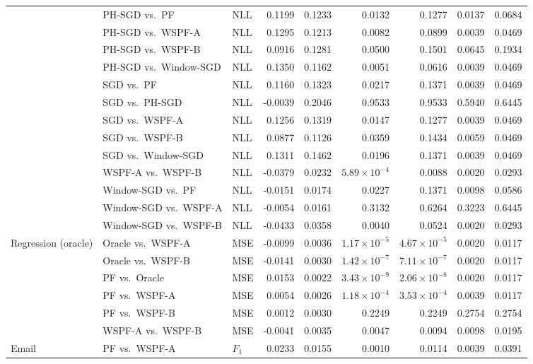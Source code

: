 {\begin{longtable}{@{}lllrrrrrr@{}}
 & PH-SGD vs.\ PF & NLL & 0.1199 & 0.1233 & 0.0132 & 0.1277 & 0.0137 & 0.0684 \\
 & PH-SGD vs.\ WSPF-A & NLL & 0.1295 & 0.1213 & 0.0082 & 0.0899 & 0.0039 & 0.0469 \\
 & PH-SGD vs.\ WSPF-B & NLL & 0.0916 & 0.1281 & 0.0500 & 0.1501 & 0.0645 & 0.1934 \\
 & PH-SGD vs.\ Window-SGD & NLL & 0.1350 & 0.1162 & 0.0051 & 0.0616 & 0.0039 & 0.0469 \\
 & SGD vs.\ PF & NLL & 0.1160 & 0.1323 & 0.0217 & 0.1371 & 0.0039 & 0.0469 \\
 & SGD vs.\ PH-SGD & NLL & -0.0039 & 0.2046 & 0.9533 & 0.9533 & 0.5940 & 0.6445 \\
 & SGD vs.\ WSPF-A & NLL & 0.1256 & 0.1319 & 0.0147 & 0.1277 & 0.0039 & 0.0469 \\
 & SGD vs.\ WSPF-B & NLL & 0.0877 & 0.1126 & 0.0359 & 0.1434 & 0.0059 & 0.0469 \\
 & SGD vs.\ Window-SGD & NLL & 0.1311 & 0.1462 & 0.0196 & 0.1371 & 0.0039 & 0.0469 \\
 & WSPF-A vs.\ WSPF-B & NLL & -0.0379 & 0.0232 & $5.89\times 10^{-4}$ & 0.0088 & 0.0020 & 0.0293 \\
 & Window-SGD vs.\ PF & NLL & -0.0151 & 0.0174 & 0.0227 & 0.1371 & 0.0098 & 0.0586 \\
 & Window-SGD vs.\ WSPF-A & NLL & -0.0054 & 0.0161 & 0.3132 & 0.6264 & 0.3223 & 0.6445 \\
 & Window-SGD vs.\ WSPF-B & NLL & -0.0433 & 0.0358 & 0.0040 & 0.0524 & 0.0020 & 0.0293 \\
\midrule
Regression (oracle) & Oracle vs.\ WSPF-A & MSE & -0.0099 & 0.0036 & $1.17\times 10^{-5}$ & $4.67\times 10^{-5}$ & 0.0020 & 0.0117 \\
 & Oracle vs.\ WSPF-B & MSE & -0.0141 & 0.0030 & $1.42\times 10^{-7}$ & $7.11\times 10^{-7}$ & 0.0020 & 0.0117 \\
 & PF vs.\ Oracle & MSE & 0.0153 & 0.0022 & $3.43\times 10^{-9}$ & $2.06\times 10^{-8}$ & 0.0020 & 0.0117 \\
 & PF vs.\ WSPF-A & MSE & 0.0054 & 0.0026 & $1.18\times 10^{-4}$ & $3.53\times 10^{-4}$ & 0.0039 & 0.0117 \\
 & PF vs.\ WSPF-B & MSE & 0.0012 & 0.0030 & 0.2249 & 0.2249 & 0.2754 & 0.2754 \\
 & WSPF-A vs.\ WSPF-B & MSE & -0.0041 & 0.0035 & 0.0047 & 0.0094 & 0.0098 & 0.0195 \\
\midrule
Email & PF vs.\ WSPF-A & $F_1$ & 0.0233 & 0.0155 & 0.0010 & 0.0114 & 0.0039 & 0.0391 \\

\end{longtable}}
